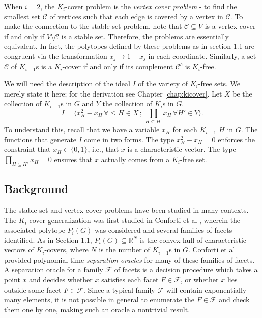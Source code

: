 When $i=2$, the $K_i$-cover problem is the \emph{vertex cover problem} - to find the smallest set $\mathcal{C}$ of vertices such that each edge is covered by a vertex in $\mathcal{C}$. 
To make the connection to the stable set problem, note that $\mathcal{C} \subseteq V$ is a vertex cover if and only if $V \setminus \mathcal{C}$ is a stable set.
Therefore, the problems are essentially equivalent.
In fact, the polytopes defined by these problems as in section 1.1 are congruent via the transformation $x_j \mapsto 1-x_j$ in each coordinate.
Similarly, a set $\mathcal{C}$ of $K_{i-1}$s is a $K_i$-cover if and only if its complement $\mathcal{C}^c$ is $K_i$-free.

We will need the description of the ideal $I$ of the variety of $K_i$-free sets.
We merely state it here; for the derivation see Chapter \ref{chap:kicover}.
Let $X$ be the collection of $K_{i-1}$s in $G$ and $Y$ the collection of $K_i$s in $G$.
$$I = \langle x_H^2 - x_H\, \forall \le H \in X\, ;\,  \prod_{H \subseteq H'} x_H\, \forall H' \in Y \rangle.$$
To understand this, recall that we have a variable $x_H$ for each $K_{i-1}$ $H$ in $G$.
The functions that generate $I$ come in two forms.
The type $x_H^2 - x_H = 0$ enforces the constraint that $x_H \in \{0,1\}$, i.e., that $x$ is a characteristic vector.
The type $\prod_{H \subseteq H'} x_H= 0$ ensures that $x$ actually comes from a $K_i$-free set.

\subsection{Background}

The stable set and vertex cover problems have been studied in many contexts. 
The $K_i$-cover generalization was first studied in Conforti et al \cite{conforti}, wherein the associated polytope $P_i(G)$ was considered and several families of facets identified. 
As in Section 1.1, $P_i(G) \subseteq \mathbb{R}^N$ is the convex hull of characteristic vectors of $K_i$-covers, where $N$ is the number of $K_{i-1}$s in $G$. 
Conforti et al provided polynomial-time {\em separation oracles} for many of these families of facets. 
A separation oracle for a family $\mathcal{F}$ of facets is a decision procedure which takes a point $x$ and decides whether $x$ satisfies each facet $F \in \mathcal{F}$, or whether $x$ lies outside some facet $F \in \mathcal{F}$.
Since a typical family $\mathcal{F}$ will contain exponentially many elements, it is not possible in general to enumerate the $F \in \mathcal{F}$ and check them one by one, making such an oracle a nontrivial result.

